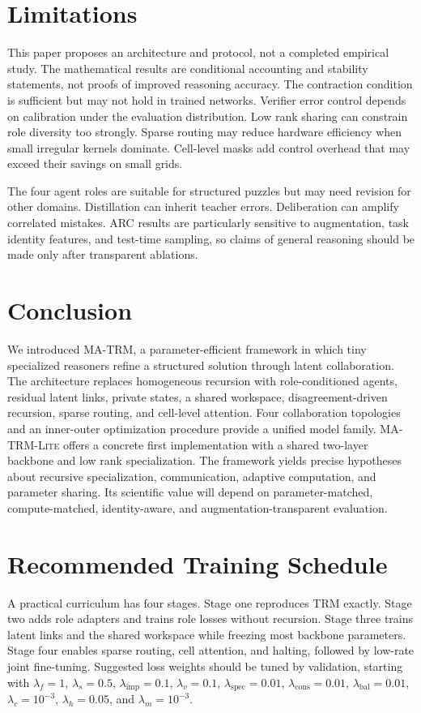 \documentclass[10pt,a4paper,twocolumn]{article}
\newcommand{\MA}{\textsc{MA-TRM}}
\newcommand{\MALite}{\textsc{MA-TRM-Lite}}
\begin{document}
\section{Limitations}
This paper proposes an architecture and protocol, not a completed empirical study. The mathematical results are conditional accounting and stability statements, not proofs of improved reasoning accuracy. The contraction condition is sufficient but may not hold in trained networks. Verifier error control depends on calibration under the evaluation distribution. Low rank sharing can constrain role diversity too strongly. Sparse routing may reduce hardware efficiency when small irregular kernels dominate. Cell-level masks add control overhead that may exceed their savings on small grids.

The four agent roles are suitable for structured puzzles but may need revision for other domains. Distillation can inherit teacher errors. Deliberation can amplify correlated mistakes. ARC results are particularly sensitive to augmentation, task identity features, and test-time sampling, so claims of general reasoning should be made only after transparent ablations.

\section{Conclusion}
We introduced \MA, a parameter-efficient framework in which tiny specialized reasoners refine a structured solution through latent collaboration. The architecture replaces homogeneous recursion with role-conditioned agents, residual latent links, private states, a shared workspace, disagreement-driven recursion, sparse routing, and cell-level attention. Four collaboration topologies and an inner-outer optimization procedure provide a unified model family. \MALite{} offers a concrete first implementation with a shared two-layer backbone and low rank specialization. The framework yields precise hypotheses about recursive specialization, communication, adaptive computation, and parameter sharing. Its scientific value will depend on parameter-matched, compute-matched, identity-aware, and augmentation-transparent evaluation.

\appendix
\section{Recommended Training Schedule}
A practical curriculum has four stages. Stage one reproduces TRM exactly. Stage two adds role adapters and trains role losses without recursion. Stage three trains latent links and the shared workspace while freezing most backbone parameters. Stage four enables sparse routing, cell attention, and halting, followed by low-rate joint fine-tuning. Suggested loss weights should be tuned by validation, starting with $\lambda_f=1$, $\lambda_s=0.5$, $\lambda_{\mathrm{imp}}=0.1$, $\lambda_v=0.1$, $\lambda_{\mathrm{spec}}=0.01$, $\lambda_{\mathrm{cons}}=0.01$, $\lambda_{\mathrm{bal}}=0.01$, $\lambda_c=10^{-3}$, $\lambda_h=0.05$, and $\lambda_m=10^{-3}$.
\end{document}
